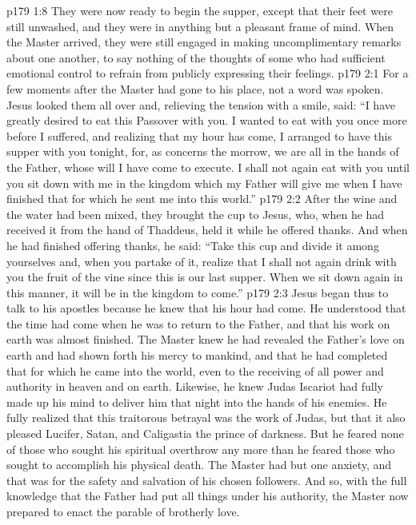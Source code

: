 \vs p179 1:8 They were now ready to begin the supper, except that their feet were still unwashed, and they were in anything but a pleasant frame of mind. When the Master arrived, they were still engaged in making uncomplimentary remarks about one another, to say nothing of the thoughts of some who had sufficient emotional control to refrain from publicly expressing their feelings.
\vs p179 2:1 For a few moments after the Master had gone to his place, not a word was spoken. Jesus looked them all over and, relieving the tension with a smile, said: \textcolor{ubdarkred}{“I have greatly desired to eat this Passover with you. I wanted to eat with you once more before I suffered, and realizing that my hour has come, I arranged to have this supper with you tonight, for, as concerns the morrow, we are all in the hands of the Father, whose will I have come to execute. I shall not again eat with you until you sit down with me in the kingdom which my Father will give me when I have finished that for which he sent me into this world.”}
\vs p179 2:2 After the wine and the water had been mixed, they brought the cup to Jesus, who, when he had received it from the hand of Thaddeus, held it while he offered thanks. And when he had finished offering thanks, he said: \textcolor{ubdarkred}{“Take this cup and divide it among yourselves and, when you partake of it, realize that I shall not again drink with you the fruit of the vine since this is our last supper. When we sit down again in this manner, it will be in the kingdom to come.”}
\vs p179 2:3 Jesus began thus to talk to his apostles because he knew that his hour had come. He understood that the time had come when he was to return to the Father, and that his work on earth was almost finished. The Master knew he had revealed the Father’s love on earth and had shown forth his mercy to mankind, and that he had completed that for which he came into the world, even to the receiving of all power and authority in heaven and on earth. Likewise, he knew Judas Iscariot had fully made up his mind to deliver him that night into the hands of his enemies. He fully realized that this traitorous betrayal was the work of Judas, but that it also pleased Lucifer, Satan, and Caligastia the prince of darkness. But he feared none of those who sought his spiritual overthrow any more than he feared those who sought to accomplish his physical death. The Master had but one anxiety, and that was for the safety and salvation of his chosen followers. And so, with the full knowledge that the Father had put all things under his authority, the Master now prepared to enact the parable of brotherly love.
